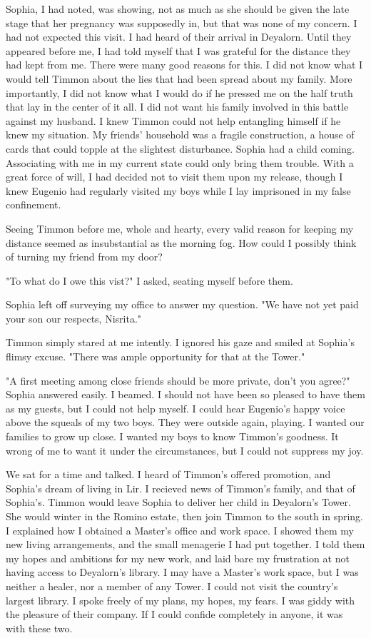 \documentclass{article}
\begin{document}
Sophia, I had noted, was showing, not as much as she should be given the late stage that her pregnancy was supposedly in, but that was none of my concern. I had not expected this visit. I had heard of their arrival in Deyalorn. Until they appeared before me, I had told myself that I was grateful for the distance they had kept from me. There were many good reasons for this. I did not know what I would tell Timmon about the lies that had been spread about my family. More importantly, I did not know what I would do if he pressed me on the half truth that lay in the center of it all. I did not want his family involved in this battle against my husband. I knew Timmon could not help entangling himself if he knew my situation. My friends' household was a fragile construction, a house of cards that could topple at the slightest disturbance. Sophia had a child coming. Associating with me in my current state could only bring them trouble. With a great force of will, I had decided not to visit them upon my release, though I knew Eugenio had regularly visited my boys while I lay imprisoned in my false confinement.

Seeing Timmon before me, whole and hearty, every valid reason for keeping my distance seemed as insubstantial as the morning fog. How could I possibly think of turning my friend from my door?

"To what do I owe this vist?" I asked, seating myself before them. 

Sophia left off surveying my office to answer my question. "We have not yet paid your son our respects, Nisrita." 

Timmon simply stared at me intently. I ignored his gaze  and smiled at Sophia's flimsy excuse. "There was ample opportunity for that at the Tower."

"A first meeting among close friends should be more private, don't you agree?" Sophia answered easily. I beamed. I should not have been so pleased to have them as my guests, but I could not help myself. I could hear Eugenio's happy voice above the squeals of my two boys. They were outside again, playing. I wanted our families to grow up close. I wanted my boys to know Timmon's goodness. It wrong of me to want it under the circumstances, but I could not suppress my joy.

We sat for a time and talked. I heard of Timmon's offered promotion, and Sophia's dream of living in Lir. I recieved news of Timmon's family, and that of Sophia's. Timmon would leave Sophia to deliver her child in Deyalorn's Tower. She would winter in the Romino estate, then join Timmon to the south in spring. I explained how I obtained a Master's office and work space. I showed them my new living arrangements, and the small menagerie I had put together. I told them my hopes and ambitions for my new work, and laid bare my frustration at not having access to Deyalorn's library. I may have a Master's work space, but I was neither a healer, nor a member of any Tower. I could not visit the country's largest library. I spoke freely of my plans, my hopes, my fears. I was giddy with the pleasure of their company. If I could confide completely in anyone, it was with these two. 
\end{document}
